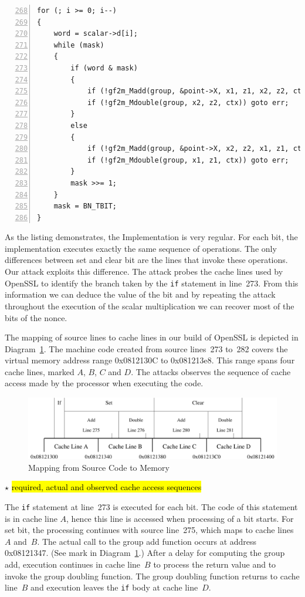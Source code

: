 \documentclass{llncs}
\newcommand{\starpar}[1]{\par{\footnotesize $\star$ \hl{#1}\par}}
\begin{document}
\begin{lstlisting}[numbers=left,firstnumber=268,float=htb,caption=OpenSSL Implementation of the Montgomery Ladder,label=lst:openssl]
for (; i >= 0; i--)
{
    word = scalar->d[i];
    while (mask)
    {
        if (word & mask)
        {
            if (!gf2m_Madd(group, &point->X, x1, z1, x2, z2, ctx)) goto err;
            if (!gf2m_Mdouble(group, x2, z2, ctx)) goto err;
        }
        else
        {
            if (!gf2m_Madd(group, &point->X, x2, z2, x1, z1, ctx)) goto err;
            if (!gf2m_Mdouble(group, x1, z1, ctx)) goto err;
        }
        mask >>= 1;
    }
    mask = BN_TBIT;
}
\end{lstlisting}

As the listing demonstrates, the Implementation is very regular.
For each bit, the implementation executes exactly the same sequence of operations.
The only differences between set and clear bit are the lines that invoke these operations.
Our attack exploits this difference.
The attack probes the cache lines used by OpenSSL to identify the branch taken by the \texttt{if}
statement in line~273.
From this information we can deduce the value of the bit and by repeating the attack throughout
the execution of the scalar multiplication we can recover most of the bits of the nonce.


The mapping of source lines to cache lines in our build of OpenSSL is depicted in Diagram~\ref{dgm:memory}.
The machine code created from source lines~273 to~282 covers the virtual memory address range 0x0812130C
to 0x081213e8.
This range spans four cache lines, marked $A$, $B$, $C$ and $D$.
The attacks observes the sequence of cache access made by the processor when executing the code.


\begin{figure}[htb]
\centering\includegraphics[width=\columnwidth]{images/memory}
\caption{Mapping from Source Code to Memory\label{dgm:memory}}
\end{figure}


\starpar{required, actual and observed cache access sequences}

The \texttt{if} statement at line~273 is executed for each bit.  
The code of this statement is in cache line $A$, hence this line is accessed when processing of a bit starts.
For set bit, the processing continues with source line~275, which maps to cache lines~$A$ and~$B$.
The actual call to the group add function occurs at address 0x08121347.
(See mark in Diagram~\ref{dgm:memory}.)
After a delay for computing the group add, execution continues in cache line~$B$ to process the return value and 
to invoke the group doubling function.
The group doubling function returns to cache line~$B$ and execution leaves the \texttt{if} body at cache line~$D$.
\end{document}
